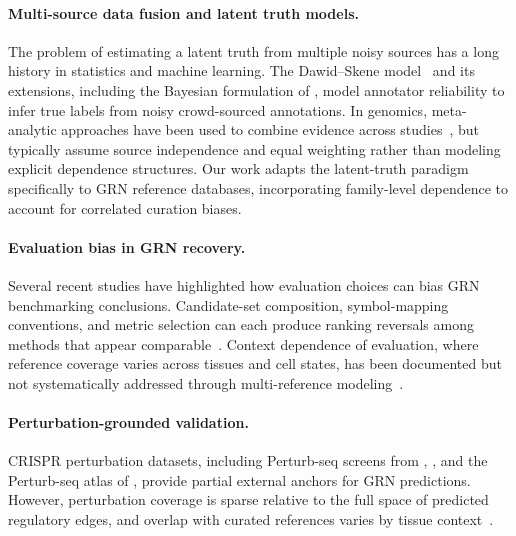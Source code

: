 \documentclass[11pt,a4paper]{article}
\begin{document}
\paragraph{Multi-source data fusion and latent truth models.}
The problem of estimating a latent truth from multiple noisy sources has a long history in statistics and machine learning.
The Dawid--Skene model~\citep{dawid1979maximum} and its extensions, including the Bayesian formulation of \citet{raykar2010learning}, model annotator reliability to infer true labels from noisy crowd-sourced annotations.
In genomics, meta-analytic approaches have been used to combine evidence across studies~\citep{tseng2012comprehensive}, but typically assume source independence and equal weighting rather than modeling explicit dependence structures.
Our work adapts the latent-truth paradigm specifically to GRN reference databases, incorporating family-level dependence to account for correlated curation biases.

\paragraph{Evaluation bias in GRN recovery.}
Several recent studies have highlighted how evaluation choices can bias GRN benchmarking conclusions.
Candidate-set composition, symbol-mapping conventions, and metric selection can each produce ranking reversals among methods that appear comparable~\citep{pratapa2020benchmarking, jackson2020gene}.
Context dependence of evaluation, where reference coverage varies across tissues and cell states, has been documented but not systematically addressed through multi-reference modeling~\citep{bravo2023scenic}.

\paragraph{Perturbation-grounded validation.}
CRISPR perturbation datasets, including Perturb-seq screens from \citet{dixit2016perturb}, \citet{adamson2016multiplexed}, and the Perturb-seq atlas of \citet{replogle2022mapping}, provide partial external anchors for GRN predictions.
However, perturbation coverage is sparse relative to the full space of predicted regulatory edges, and overlap with curated references varies by tissue context~\citep{kamimoto2023dissecting}.
\end{document}
